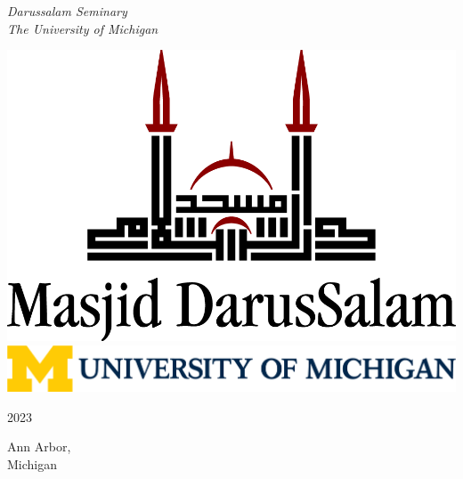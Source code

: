 \documentclass[11pt,twoside]{book}
\begin{document}
\begin{titlepage}
	\vspace{0.5\baselineskip} %
	
	\textit{\textenglish{Darussalam Seminary \\ The University of Michigan}} %
	
	\vfill %
	
	
    \includegraphics[scale=0.4]{MasjidLogo}\\
    \includegraphics[scale=0.4]{UMLogo}
	
	\vspace{0.3\baselineskip} %
	
	\textenglish{2023} %
	

\end{titlepage}

\thispagestyle{empty} %
\vspace*{\fill}
\begin{center}

\vspace{10mm}

\itshape{}

\vspace{10mm}

\textenglish{Ann Arbor,}\\
\textenglish{Michigan}

\end{center}
\vspace*{\fill}
\end{document}
